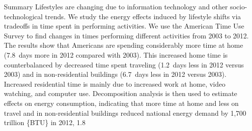 Summary Lifestyles are changing due to information technology and other socio-technological trends. We study the energy effects induced by lifestyle shifts via tradeoffs in time spent in performing activities. We use the American Time Use Survey to find changes in times performing different activities from 2003 to 2012. The results show that Americans are spending considerably more time at home (7.8 days more in 2012 compared with 2003). This increased home time is counterbalanced by decreased time spent traveling (1.2 days less in 2012 versus 2003) and in non-residential buildings (6.7 days less in 2012 versus 2003). Increased residential time is mainly due to increased work at home, video watching, and computer use. Decomposition analysis is then used to estimate effects on energy consumption, indicating that more time at home and less on travel and in non-residential buildings reduced national energy demand by 1,700 trillion \{BTU\} in 2012, 1.8%